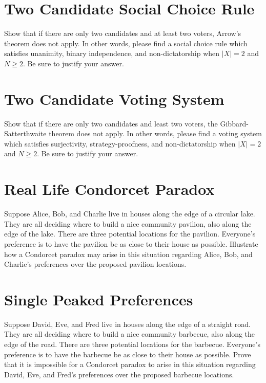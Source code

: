 \documentclass[11pt]{article}
\title{}
\date{}
\theoremstyle{definition}
\theoremstyle{plain}
\begin{document}
\section{Two Candidate Social Choice Rule}
Show that if there are only two candidates and at least two voters, Arrow's theorem does not apply. In other words, please find a social choice rule which satisfies unanimity, binary independence, and non-dictatorship when $|X|=2$ and $N \geq 2$. Be sure to justify your answer.

\section{Two Candidate Voting System}
Show that if there are only two candidates and least two voters, the Gibbard-Satterthwaite theorem does not apply. In other words, please find a voting system which satisfies surjectivity, strategy-proofness, and non-dictatorship when $|X|=2$ and $N \geq 2$. Be sure to justify your answer.

\section{Real Life Condorcet Paradox}
Suppose Alice, Bob, and Charlie live in houses along the edge of a circular lake. They are all deciding where to build a nice community pavilion, also along the edge of the lake. There are three potential locations for the pavilion. Everyone's preference is to have the pavilion be as close to their house as possible. Illustrate how a Condorcet paradox may arise in this situation regarding Alice, Bob, and Charlie's preferences over the proposed pavilion locations.  

\section{Single Peaked Preferences}
Suppose David, Eve, and Fred live in houses along the edge of a straight road. They are all deciding where to build a nice community barbecue, also along the edge of the road. There are three potential locations for the barbecue. Everyone's preference is to have the barbecue be as close to their house as possible. Prove that it is impossible for a Condorcet paradox to arise in this situation regarding David, Eve, and Fred's preferences over the proposed barbecue locations.   
\end{document}
